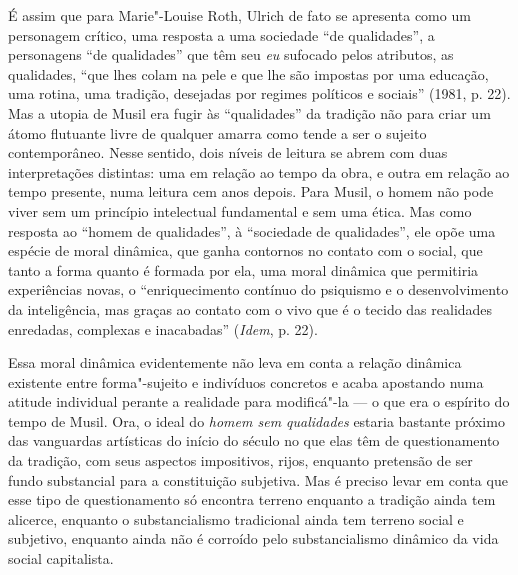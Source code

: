 É assim que para Marie"-Louise Roth, Ulrich de fato se apresenta como um
personagem crítico, uma resposta a uma sociedade ``de qualidades'', a
personagens ``de qualidades'' que têm seu \emph{eu} sufocado pelos
atributos, as qualidades, ``que lhes colam na pele e que lhe são
impostas por uma educação, uma rotina, uma tradição, desejadas por
regimes políticos e sociais'' (1981, p. 22). Mas a utopia de Musil era
fugir às ``qualidades'' da tradição não para criar um átomo flutuante
livre de qualquer amarra como tende a ser o sujeito contemporâneo.
Nesse sentido, dois níveis de leitura se abrem com duas interpretações
distintas: uma em relação ao tempo da obra, e outra em relação ao tempo
presente, numa leitura cem anos depois. Para Musil, o homem não pode
viver sem um princípio intelectual fundamental e sem uma ética. Mas como
resposta ao ``homem de qualidades'', à ``sociedade de qualidades'', ele
opõe uma espécie de moral dinâmica, que ganha contornos no contato com o
social, que tanto a forma quanto é formada por ela, uma moral dinâmica
que permitiria experiências novas, o ``enriquecimento contínuo do
psiquismo e o desenvolvimento da inteligência, mas graças ao contato com
o vivo que é o tecido das realidades enredadas, complexas e
inacabadas'' (\emph{Idem}, p. 22).

Essa moral dinâmica evidentemente não leva em conta a relação dinâmica
existente entre forma"-sujeito e indivíduos concretos e acaba apostando
numa atitude individual perante a realidade para modificá"-la --- o que
era o espírito do tempo de Musil. Ora, o ideal do \emph{homem
sem qualidades} estaria bastante próximo das vanguardas artísticas do
início do século  no que elas têm de questionamento da tradição, com
seus aspectos impositivos, rijos, enquanto pretensão de ser fundo
substancial para a constituição subjetiva. Mas é preciso levar em conta
que esse tipo de questionamento só encontra terreno enquanto a tradição
ainda tem alicerce, enquanto o substancialismo tradicional ainda tem
terreno social e subjetivo, enquanto ainda não é corroído pelo
substancialismo dinâmico da vida social capitalista.

